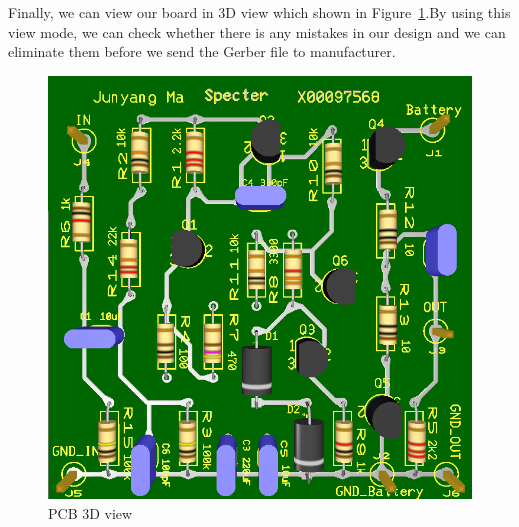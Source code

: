 Finally, we can view our board in 3D view which shown in Figure~\ref{fig:PCB 3D view}.By using this view mode, we can check whether there is any mistakes in our design and we can eliminate them before we send the Gerber file to manufacturer.

\begin{figure}[htbp]
	\centering
	\includegraphics[scale=0.6]{"../Photo/Chap6/final PCB 3D view"}
	\caption{PCB 3D view }
	\label{fig:PCB 3D view}
\end{figure}
